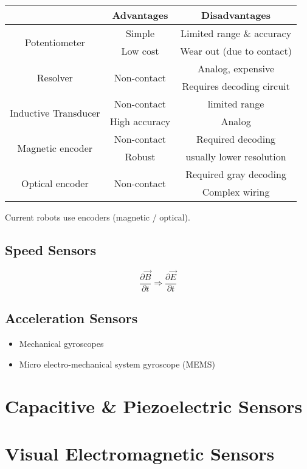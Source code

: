 \begin{table}[hbt!]
	\centering
	\begin{tabular}{c|c|c}
		& Advantages & Disadvantages\\ \hline\hline
		\multirow{2}{*}{Potentiometer} & Simple & Limited range \& accuracy\\
		& Low cost & Wear out (due to contact)\\ \hline
		\multirow{2}{*}{Resolver} & \multirow{2}{*}{Non-contact} & Analog, expensive\\
		& & Requires decoding circuit\\ \hline
		\multirow{2}{*}{Inductive Transducer} & Non-contact & limited range\\
		& High accuracy & Analog\\ \hline
		\multirow{2}{*}{Magnetic encoder} & Non-contact & Required decoding\\
		& Robust & usually lower resolution\\ \hline
		\multirow{2}{*}{Optical encoder} & \multirow{2}{*}{Non-contact} & Required gray decoding\\
		& & Complex wiring
	\end{tabular}
\end{table}

\note Current robots use encoders (magnetic / optical).

\subsection{Speed Sensors}
\[\frac{\partial \vec{B}}{\partial t} \Rightarrow \frac{\partial \vec{E}}{\partial t}\]
\subsection{Acceleration Sensors}
\begin{itemize}
	\item Mechanical gyroscopes 
	\item Micro electro-mechanical system gyroscope (MEMS)
\end{itemize}

\section{Capacitive \& Piezoelectric Sensors}
\label{sec:capacitive-piezoelectric-sensors}

\section{Visual Electromagnetic Sensors}

